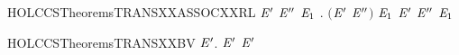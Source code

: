 \newcommand{\HOLCCSTheoremsTRANSXXASSOCXXEQ}{\UseVerbatim{HOLCCSTheoremsTRANSXXASSOCXXEQ}}
\begin{SaveVerbatim}{HOLCCSTheoremsTRANSXXASSOCXXRL}
\HOLTokenTurnstile{} \HOLSymConst{\HOLTokenForall{}} \ensuremath{\HOLBoundVar{E}\sp{\prime{}}} \ensuremath{\HOLBoundVar{E}\sp{\prime{}\prime{}}} \ensuremath{\HOLBoundVar{E}\sb{\mathrm{1}}} .  \HOLSymConst{\ensuremath{+}} \ensuremath{(}\ensuremath{\HOLBoundVar{E}\sp{\prime{}}} \HOLSymConst{\ensuremath{+}} \ensuremath{\HOLBoundVar{E}\sp{\prime{}\prime{}}}\ensuremath{)} \HOLTokenTransBegin{}\HOLTokenTransEnd \ensuremath{\HOLBoundVar{E}\sb{\mathrm{1}}} \HOLSymConst{\HOLTokenImp{}}  \HOLSymConst{\ensuremath{+}} \ensuremath{\HOLBoundVar{E}\sp{\prime{}}} \HOLSymConst{\ensuremath{+}} \ensuremath{\HOLBoundVar{E}\sp{\prime{}\prime{}}} \HOLTokenTransBegin{}\HOLTokenTransEnd \ensuremath{\HOLBoundVar{E}\sb{\mathrm{1}}}
\end{SaveVerbatim}
\newcommand{\HOLCCSTheoremsTRANSXXASSOCXXRL}{\UseVerbatim{HOLCCSTheoremsTRANSXXASSOCXXRL}}
\begin{SaveVerbatim}{HOLCCSTheoremsTRANSXXBV}
\HOLTokenTurnstile{} \HOLSymConst{\HOLTokenForall{}}  \ensuremath{\HOLBoundVar{E}\sp{\prime{}}}.  \HOLTokenTransBegin{}\HOLTokenTransEnd \ensuremath{\HOLBoundVar{E}\sp{\prime{}}} \HOLSymConst{\HOLTokenImp{}}  \ensuremath{\HOLBoundVar{E}\sp{\prime{}}} \HOLConst{\HOLTokenSubset{}}  
\end{SaveVerbatim}
\newcommand{\HOLCCSTheoremsTRANSXXBV}{\UseVerbatim{HOLCCSTheoremsTRANSXXBV}}
